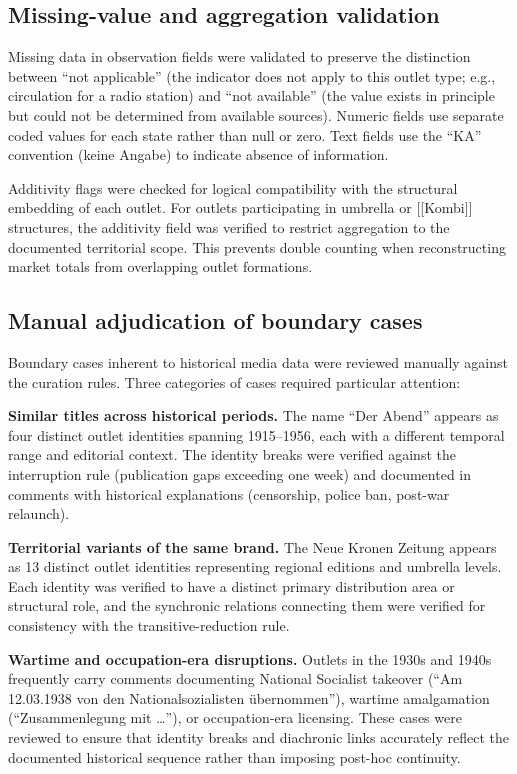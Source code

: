 \documentclass[11pt]{article}
\begin{document}
\subsection{Missing-value and aggregation validation}

Missing data in observation fields were validated to preserve the distinction between ``not applicable'' (the indicator does not apply to this outlet type; e.g., circulation for a radio station) and ``not available'' (the value exists in principle but could not be determined from available sources). Numeric fields use separate coded values for each state rather than null or zero. Text fields use the ``KA'' convention (keine Angabe) to indicate absence of information.

Additivity flags were checked for logical compatibility with the structural embedding of each outlet. For outlets participating in umbrella or [[Kombi]] structures, the additivity field was verified to restrict aggregation to the documented territorial scope. This prevents double counting when reconstructing market totals from overlapping outlet formations.

\subsection{Manual adjudication of boundary cases}

Boundary cases inherent to historical media data were reviewed manually against the curation rules. Three categories of cases required particular attention:

\textbf{Similar titles across historical periods.} The name ``Der Abend'' appears as four distinct outlet identities spanning 1915--1956, each with a different temporal range and editorial context. The identity breaks were verified against the interruption rule (publication gaps exceeding one week) and documented in comments with historical explanations (censorship, police ban, post-war relaunch).

\textbf{Territorial variants of the same brand.} The Neue Kronen Zeitung appears as 13 distinct outlet identities representing regional editions and umbrella levels. Each identity was verified to have a distinct primary distribution area or structural role, and the synchronic relations connecting them were verified for consistency with the transitive-reduction rule.

\textbf{Wartime and occupation-era disruptions.} Outlets in the 1930s and 1940s frequently carry comments documenting National Socialist takeover (``Am 12.03.1938 von den Nationalsozialisten \"ubernommen''), wartime amalgamation (``Zusammenlegung mit \ldots''), or occupation-era licensing. These cases were reviewed to ensure that identity breaks and diachronic links accurately reflect the documented historical sequence rather than imposing post-hoc continuity.
\end{document}
